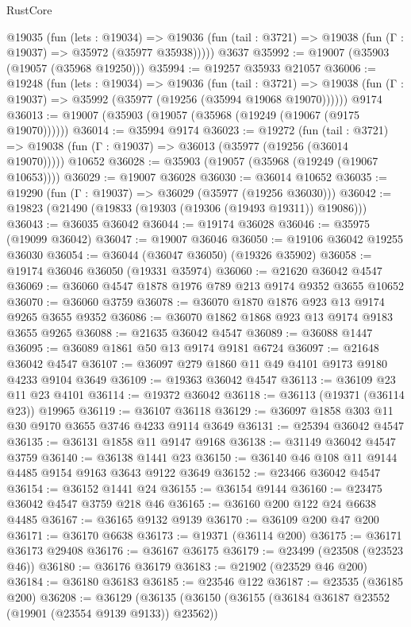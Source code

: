 \begin{lexlean}{RustCore}
\begin{coremodule}
    @19035
      (fun (lets : @19034) =>
      @19036 (fun (tail : @3721) => @19038 (fun (Γ : @19037) => @35972 (@35977 @35938)))))
    @3637
@35992 := @19007 (@35903 (@19057 (@35968 @19250)))
@35994 := @19257 @35933 @21057
@36006 := @19248
    (fun (lets : @19034) =>
    @19036
      (fun (tail : @3721) =>
      @19038 (fun (Γ : @19037) => @35992 (@35977 (@19256 (@35994 @19068 @19070))))))
    @9174
@36013 := @19007 (@35903 (@19057 (@35968 (@19249 (@19067 (@9175 @19070))))))
@36014 := @35994 @9174
@36023 := @19272
    (fun (tail : @3721) => @19038 (fun (Γ : @19037) => @36013 (@35977 (@19256 (@36014 @19070)))))
    @10652
@36028 := @35903 (@19057 (@35968 (@19249 (@19067 @10653))))
@36029 := @19007 @36028
@36030 := @36014 @10652
@36035 := @19290 (fun (Γ : @19037) => @36029 (@35977 (@19256 @36030)))
@36042 := @19823 (@21490 (@19833 (@19303 (@19306 (@19493 @19311)) @19086)))
@36043 := @36035 @36042
@36044 := @19174 @36028
@36046 := @35975 (@19099 @36042)
@36047 := @19007 @36046
@36050 := @19106 @36042 @19255 @36030
@36054 := @36044 (@36047 @36050) (@19326 @35902)
@36058 := @19174 @36046 @36050 (@19331 @35974)
@36060 := @21620 @36042 @4547
@36069 := @36060 @4547 @1878 @1976 @789 @213 @9174 @9352 @3655 @10652
@36070 := @36060 @3759
@36078 := @36070 @1870 @1876 @923 @13 @9174 @9265 @3655 @9352
@36086 := @36070 @1862 @1868 @923 @13 @9174 @9183 @3655 @9265
@36088 := @21635 @36042 @4547
@36089 := @36088 @1447
@36095 := @36089 @1861 @50 @13 @9174 @9181 @6724
@36097 := @21648 @36042 @4547
@36107 := @36097 @279 @1860 @11 @49 @4101 @9173 @9180 @4233 @9104 @3649
@36109 := @19363 @36042 @4547
@36113 := @36109 @23 @11 @23 @4101
@36114 := @19372 @36042
@36118 := @36113 (@19371 (@36114 @23)) @19965
@36119 := @36107 @36118
@36129 := @36097 @1858 @303 @11 @30 @9170 @3655 @3746 @4233 @9114 @3649
@36131 := @25394 @36042 @4547
@36135 := @36131 @1858 @11 @9147 @9168
@36138 := @31149 @36042 @4547 @3759
@36140 := @36138 @1441 @23
@36150 := @36140 @46 @108 @11 @9144 @4485 @9154 @9163 @3643 @9122 @3649
@36152 := @23466 @36042 @4547
@36154 := @36152 @1441 @24
@36155 := @36154 @9144
@36160 := @23475 @36042 @4547 @3759 @218 @46
@36165 := @36160 @200 @122 @24 @6638 @4485
@36167 := @36165 @9132 @9139
@36170 := @36109 @200 @47 @200
@36171 := @36170 @6638
@36173 := @19371 (@36114 @200)
@36175 := @36171 @36173 @29408
@36176 := @36167 @36175
@36179 := @23499 (@23508 (@23523 @46))
@36180 := @36176 @36179
@36183 := @21902 (@23529 @46 @200)
@36184 := @36180 @36183
@36185 := @23546 @122
@36187 := @23535 (@36185 @200)
@36208 := @36129
    (@36135
      (@36150
        (@36155 (@36184 @36187 @23552 (@19901 (@23554 @9139 @9133)) @23562))

\end{coremodule}
\end{lexlean}
